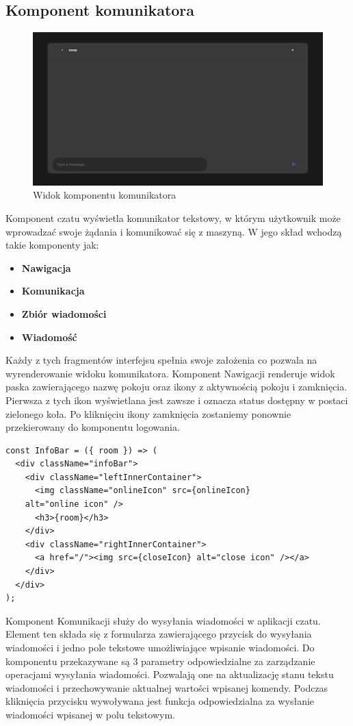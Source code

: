 \subsection{Komponent komunikatora}
\begin{figure}[htbp]
	\centering
	\includegraphics[width=0.7\linewidth]{"obrazy/komunikator"}
	\caption{Widok komponentu komunikatora}
	\label{fig:9}
\end{figure} 
\newpage
Komponent czatu wyświetla komunikator tekstowy, w którym użytkownik może wprowadzać swoje żądania i komunikować się z maszyną. W jego skład wchodzą takie komponenty jak: 
\begin{itemize}  
\item \textbf{ Nawigacja}
	\\
\item \textbf{ Komunikacja}
	\\
\item \textbf{ Zbiór wiadomości}
	\\
\item \textbf{ Wiadomość}
	\\
\end{itemize}
Każdy z tych fragmentów interfejsu spełnia swoje założenia co pozwala na wyrenderowanie widoku komunikatora. Komponent Nawigacji renderuje widok paska zawierającego nazwę pokoju oraz ikony z aktywnością pokoju i zamknięcia. Pierwsza z tych ikon wyświetlana jest zawsze i oznacza status dostępny w postaci zielonego koła. Po kliknięciu ikony zamknięcia zostaniemy ponownie przekierowany do komponentu logowania.
\begin{lstlisting}[caption=Implementacja komponentu nawigacji ]
const InfoBar = ({ room }) => (
  <div className="infoBar">
    <div className="leftInnerContainer">
      <img className="onlineIcon" src={onlineIcon} 
	alt="online icon" />
      <h3>{room}</h3>
    </div>
    <div className="rightInnerContainer">
      <a href="/"><img src={closeIcon} alt="close icon" /></a>
    </div>
  </div>
);
\end{lstlisting}
Komponent Komunikacji służy do wysyłania wiadomości w aplikacji czatu. Element ten składa się z formularza zawierającego przycisk do wysyłania wiadomości i jedno pole tekstowe umożliwiające wpisanie wiadomości. Do komponentu przekazywane są 3 parametry odpowiedzialne za zarządzanie operacjami wysyłania wiadomości. Pozwalają one na aktualizację stanu tekstu wiadomości i przechowywanie aktualnej wartości wpisanej komendy. Podczas kliknięcia przycisku wywoływana jest funkcja odpowiedzialna za wysłanie wiadomości wpisanej w polu tekstowym.
